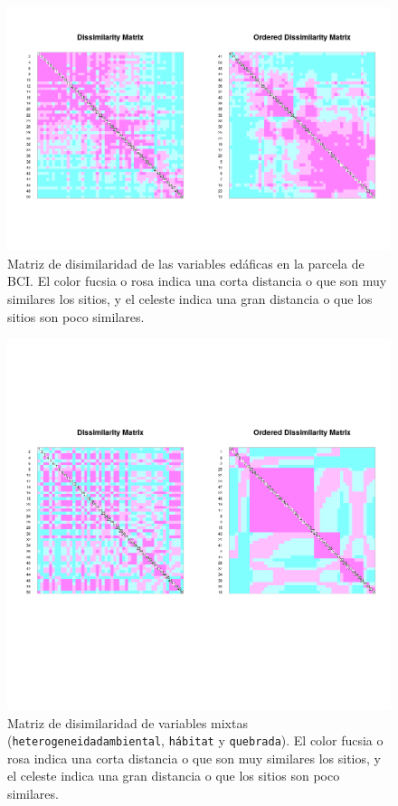 \documentclass[11pt,]{article}
\begin{document}
\begin{figure}
\centering
\includegraphics[width=1.00000\textwidth]{variables de suelo_disimilaridad.png}
\caption{Matriz de disimilaridad de las variables edáficas en la parcela
de BCI. El color fucsia o rosa indica una corta distancia o que son muy
similares los sitios, y el celeste indica una gran distancia o que los
sitios son poco similares.\label{fig:suelodis}}
\end{figure}

\begin{figure}
\centering
\includegraphics[width=1.00000\textwidth]{Variables mixtas.png}
\caption{Matriz de disimilaridad de variables mixtas
(\texttt{heterogeneidadambiental}, \texttt{hábitat} y
\texttt{quebrada}). El color fucsia o rosa indica una corta distancia o
que son muy similares los sitios, y el celeste indica una gran distancia
o que los sitios son poco similares.\label{fig:mixtadis}}
\end{figure}
\end{document}

